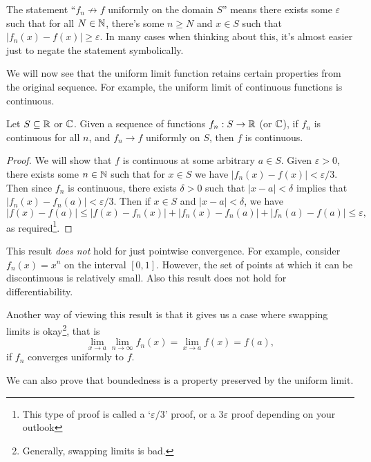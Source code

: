 \documentclass[a4paper]{scrartcl}
\begin{document}
\begin{remark}
    The statement ``$f_n \not \rightarrow f$ uniformly on the domain $S$'' means there exists some $\varepsilon$ such that for all $N \in \mathbb{N}$, there's some $n \geq N$ and $x \in S$ such that $|f_n(x) - f(x)| \geq \varepsilon$. In many cases when thinking about this, it's almost easier just to negate the statement symbolically.
\end{remark}

We will now see that the uniform limit function retains certain properties from the original sequence. For example, the uniform limit of continuous functions is continuous.

\begin{theorem}
    Let $S \subseteq \mathbb{R}$ or $\mathbb{C}$. Given a sequence of functions $f_n : S \rightarrow \mathbb{R}$ (or $\mathbb{C}$), if $f_n$ is continuous for all $n$, and $f_n \rightarrow f$ uniformly on $S$, then $f$ is continuous.
\end{theorem}
\begin{proof}
    We will show that $f$ is continuous at some arbitrary $a \in S$. Given $\varepsilon > 0$, there exists some $n \in \mathbb{N}$ such that for $x \in S$ we have $|f_n(x) - f(x)| < \varepsilon /3$. Then since $f_n$ is continuous, there exists $\delta > 0$ such that $|x - a| < \delta$ implies that $|f_n(x) - f_n(a)| < \varepsilon / 3$. Then if $x \in S$ and $|x - a| < \delta$, we have
    $$
    |f(x) - f(a)| \leq |f(x) - f_n(x)| + |f_n(x) - f_n(a)| + |f_n(a) - f(a)| \leq \varepsilon,
    $$
    as required\footnote{This type of proof is called a `$\varepsilon/3$' proof, or a $3 \varepsilon$ proof depending on your outlook}.
\end{proof}

\begin{remark}
    This result \emph{does not} hold for just pointwise convergence. For example, consider $f_n(x) = x^n$ on the interval $[0, 1]$. However, the set of points at which it can be discontinuous is relatively small. Also this result does not hold for differentiability.
\end{remark}

Another way of viewing this result is that it gives us a case where swapping limits is okay\footnote{Generally, swapping limits is bad.}, that is 
$$
    \lim_{x \to a} \lim_{n \to \infty} f_n(x) = \lim_{x \to a} f(x) = f(a),
$$
if $f_n$ converges uniformly to $f$.

We can also prove that boundedness is a property preserved by the uniform limit.
\end{document}
